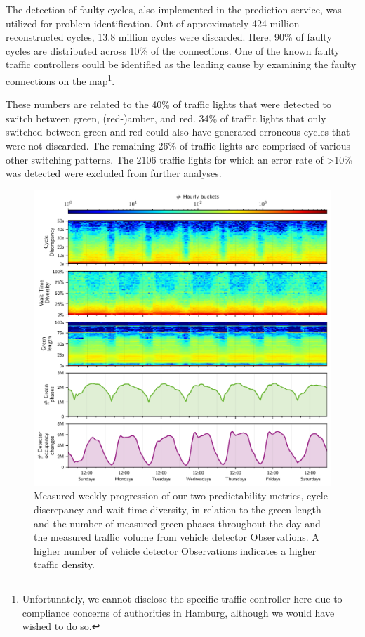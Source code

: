 The detection of faulty cycles, also implemented in the prediction service, was utilized for problem identification. Out of approximately 424 million reconstructed cycles, 13.8 million cycles were discarded. Here, 90\% of faulty cycles are distributed across 10\% of the connections. One of the known faulty traffic controllers could be identified as the leading cause by examining the faulty connections on the map\footnote{Unfortunately, we cannot disclose the specific traffic controller here due to compliance concerns of authorities in Hamburg, although we would have wished to do so.}. 

These numbers are related to the 40\% of traffic lights that were detected to switch between green, (red-)amber, and red. 34\% of traffic lights that only switched between green and red could also have generated erroneous cycles that were not discarded. The remaining 26\% of traffic lights are comprised of various other switching patterns. The 2106 traffic lights for which an error rate of >10\% was detected were excluded from further analyses.

\begin{figure}[!t]
    \centering
    \includegraphics[width=\linewidth]{images/predictability-week-heatmap.pdf}
    \caption{Measured weekly progression of our two predictability metrics, cycle discrepancy and wait time diversity, in relation to the green length and the number of measured green phases throughout the day and the measured traffic volume from vehicle detector Observations. A higher number of vehicle detector Observations indicates a higher traffic density.}\label{fig:adaptiveness-weekdays-distance}
\end{figure}


